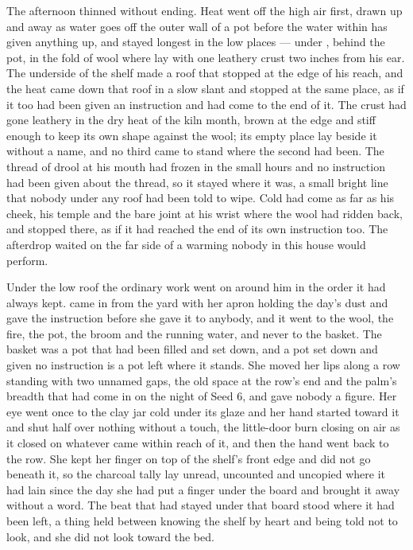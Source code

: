The afternoon thinned without ending. Heat went off the high air first, drawn up and away as water goes off the outer wall of a pot before the water within has given anything up, and stayed longest in the low places --- under , behind the pot, in the fold of wool where  lay with one leathery crust two inches from his ear. The underside of the shelf made a roof that stopped at the edge of his reach, and the heat came down that roof in a slow slant and stopped at the same place, as if it too had been given an instruction and had come to the end of it. The crust had gone leathery in the dry heat of the kiln month, brown at the edge and stiff enough to keep its own shape against the wool; its empty place lay beside it without a name, and no third came to stand where the second had been. The thread of drool at his mouth had frozen in the small hours and no instruction had been given about the thread, so it stayed where it was, a small bright line that nobody under any roof had been told to wipe. Cold had come as far as his cheek, his temple and the bare joint at his wrist where the wool had ridden back, and stopped there, as if it had reached the end of its own instruction too. The afterdrop waited on the far side of a warming nobody in this house would perform.

Under the low roof the ordinary work went on around him in the order it had always kept.  came in from the yard with her apron holding the day's dust and gave the instruction before she gave it to anybody, and it went to the wool, the fire, the pot, the broom and the running water, and never to the basket. The basket was a pot that had been filled and set down, and a pot set down and given no instruction is a pot left where it stands. She moved her lips along a row standing with two unnamed gaps, the old space at the row's end and the palm's breadth that had come in on the night of Seed 6, and gave nobody a figure. Her eye went once to the clay jar cold under its glaze and her hand started toward it and shut half over nothing without a touch, the little-door burn closing on air as it closed on whatever came within reach of it, and then the hand went back to the row. She kept her finger on top of the shelf's front edge and did not go beneath it, so the charcoal tally lay unread, uncounted and uncopied where it had lain since the day she had put a finger under the board and brought it away without a word. The beat that had stayed under that board stood where it had been left, a thing held between knowing the shelf by heart and being told not to look, and she did not look toward the bed.

